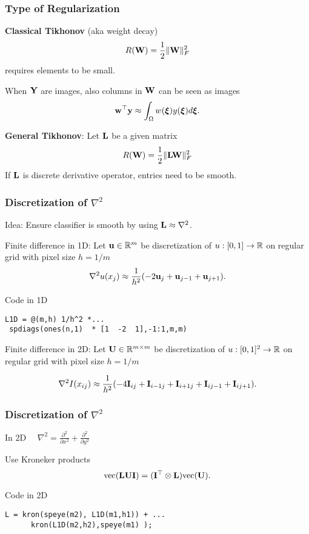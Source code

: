\documentclass[12pt,fleqn,handout]{beamer}
\begin{document}
\begin{frame}[fragile]\frametitle{Type of Regularization}

{\bf Classical Tikhonov} (aka weight decay) \\
$$ R({\bf W}) = {\frac 12} \|{\bf W}\|_F^2 $$
requires elements to be small.

\bigskip

When ${\bf Y}$ are images, also columns in ${\bf W}$ can be seen as images
$$ {\bf w}^{\top} {\bf y} \approx \int_{\Omega} w({\boldsymbol \xi}) y({\boldsymbol \xi}) d{\boldsymbol \xi}. $$

{\bf General Tikhonov}: Let ${\bf L}$ be a given matrix \\
$$ R({\bf W}) = {\frac 12} \|{\bf L} {\bf W}\|_F^2 $$
If ${\bf L}$ is discrete derivative operator, entries need to be smooth.

\end{frame}

\begin{frame}[fragile]\frametitle{Discretization of $\nabla^2$}
	
	Idea: Ensure classifier is smooth by using ${\bf L} \approx \nabla^2$.
	
	\bigskip
	\pause

Finite difference in 1D: 	Let ${\bf u} \in \mathbb{R}^{m}$ be discretization of $u: [0,1] \to \mathbb{R}$ on regular grid with pixel size $h=1/m$
$$ \nabla^2 u(x_j) \approx  {\frac 1 {h^2}} (-2 {\bf u}_{j} +  {\bf u}_{j-1} + {\bf u}_{j+1}). $$

\bigskip
\pause
Code in 1D
\begin{verbatim}
L1D = @(m,h) 1/h^2 *...
 spdiags(ones(n,1)  * [1  -2  1],-1:1,m,m)
\end{verbatim}


\bigskip
\pause

Finite difference in 2D: Let ${\bf U} \in \mathbb{R}^{m\times m}$ be discretization of $u: [0,1]^2 \to \mathbb{R}$ on regular grid with pixel size $h=1/m$

$$ \nabla^2 I(x_{ij}) \approx  {\frac 1 {h^2}} (-4 {\bf I}_{ij} + {\bf I}_{i-1j} + {\bf I}_{i+1j} + {\bf I}_{ij-1} + {\bf I}_{ij+1}). $$


\bigskip


\end{frame}


\begin{frame}[fragile]\frametitle{Discretization of $\nabla^2$}

In 2D $\quad \nabla^2 = {\frac {\partial^2}{\partial x^2}} + {\frac {\partial^2}{\partial y^2}} $


\bigskip

Use Kroneker products
$$ {\rm vec}({\bf L} {\bf U} {\bf I}) = ({\bf I}^{\top} \otimes {\bf L}) {\rm vec} ({\bf U}). $$


Code in 2D
\begin{verbatim}
L = kron(speye(m2), L1D(m1,h1)) + ...
      kron(L1D(m2,h2),speye(m1) );
\end{verbatim}

\end{frame}
\end{document}
